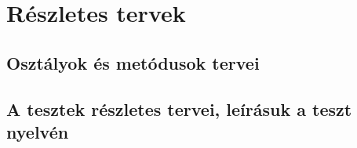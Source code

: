 %
\chapter{Részletes tervek}

\thispagestyle{fancy}

\section{Osztályok és metódusok tervei}






\section{A tesztek részletes tervei, leírásuk a teszt nyelvén}


